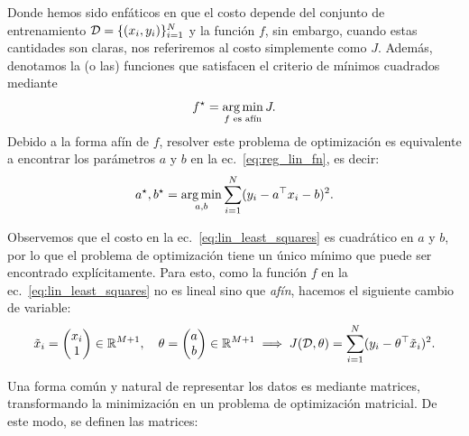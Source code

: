Donde hemos sido enfáticos en que el costo depende del conjunto de entrenamiento ${\mathcal D}=\{(x_i,y_i)\}_{i=1}^N$ y la función $f$, sin embargo, cuando estas cantidades son claras, nos referiremos al costo simplemente como $J$. Además, denotamos la (o las) funciones que satisfacen el criterio de mínimos cuadrados mediante
\begin{equation}
	f^\star = \operatorname*{arg\,min}_{f\text{ es afín}} J.
\end{equation}
Debido a la forma afín de $f$, resolver este problema de optimización es equivalente a encontrar los parámetros $a$ y $b$ en la ec.~\eqref{eq:reg_lin_fn}, es decir: 
\begin{equation}
	a^\star,b^\star = \operatorname*{arg\,min}_{a,b} \sum_{i=1}^N(y_i-a^
	\top x_i - b)^2.
	\label{eq:lin_least_squares}
\end{equation}

Observemos que el costo en la  ec.~\eqref{eq:lin_least_squares} es cuadrático en $a$ y $b$, por lo que el problema de optimización tiene un único mínimo que puede ser encontrado explícitamente. Para esto, como la función $f$ en la ec.~\eqref{eq:lin_least_squares} no es lineal sino que \emph{afín}, hacemos el siguiente cambio de variable:
\begin{equation}
  \tilde{x}_i = \left( \begin{matrix}x_i \\  1\end{matrix}\right) \in\mathbb{R}^{M+1},\quad
  \theta = \left( \begin{matrix}a \\  b\end{matrix}\right)\in\mathbb{R}^{M+1} \implies J({\mathcal D},\theta) = \sum_{i=1}^N(y_i-\theta^
	\top \tilde{x}_i)^2.
 \label{eq:truco_reg_lin} 
\end{equation}

Una forma común y natural de representar los datos es mediante matrices, transformando la minimización en un problema de optimización matricial. De este modo, se definen las matrices:

